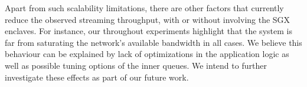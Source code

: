 Apart from such scalability limitations, there are other factors that currently reduce the observed streaming throughput, with or without involving the SGX enclaves.
For instance, our throughout experiments highlight that the system is far from saturating the network's available bandwidth in all cases.
We believe this behaviour can be explained by lack of optimizations in the application logic as well as possible tuning options of the inner \zmq{} queues.
We intend to further investigate these effects as part of our future work.

